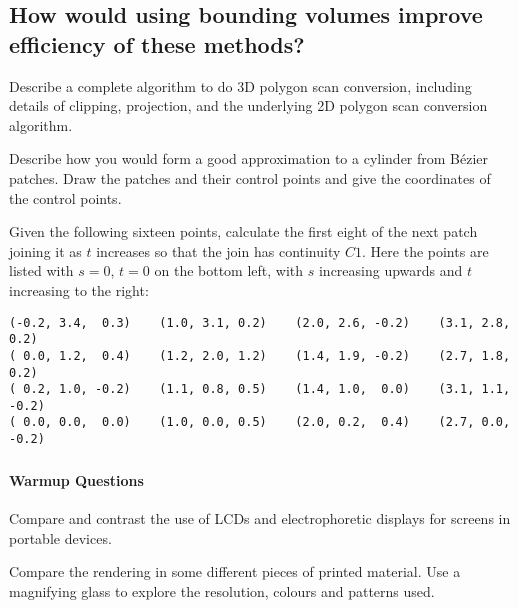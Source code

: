 \documentclass{supervision}
\begin{document}
\begin{questions}
\begin{parts}
        \part{How would using bounding volumes improve efficiency of these methods?}
    \end{parts}

    \question
    Describe a complete algorithm to do 3D polygon scan conversion, including details of clipping, projection, and the underlying 2D polygon scan conversion algorithm.

    \question
    Describe how you would form a good approximation to a cylinder from Bézier patches. Draw the patches and their control points and give the coordinates of the control points.

    \question
    Given the following sixteen points, calculate the first eight of the next patch joining it as $t$ increases so that the join has continuity $C1$. Here the points are listed with $s=0$, $t=0$ on the bottom left, with $s$ increasing upwards and $t$ increasing to the right:
    \begin{Verbatim}[fontsize=\scriptsize]
(-0.2, 3.4,  0.3)    (1.0, 3.1, 0.2)    (2.0, 2.6, -0.2)    (3.1, 2.8,  0.2)
( 0.0, 1.2,  0.4)    (1.2, 2.0, 1.2)    (1.4, 1.9, -0.2)    (2.7, 1.8,  0.2)
( 0.2, 1.0, -0.2)    (1.1, 0.8, 0.5)    (1.4, 1.0,  0.0)    (3.1, 1.1, -0.2)
( 0.0, 0.0,  0.0)    (1.0, 0.0, 0.5)    (2.0, 0.2,  0.4)    (2.7, 0.0, -0.2)
    \end{Verbatim}

\end{questions}

\section*{\Topics}
\subsection*{Warmup Questions}
\begin{questions}
    \question
    Compare and contrast the use of LCDs and electrophoretic displays for screens in portable devices.

    \question
    Compare the rendering in some different pieces of printed material. Use a magnifying glass to explore the resolution, colours and patterns used.

\end{questions}
\end{document}
